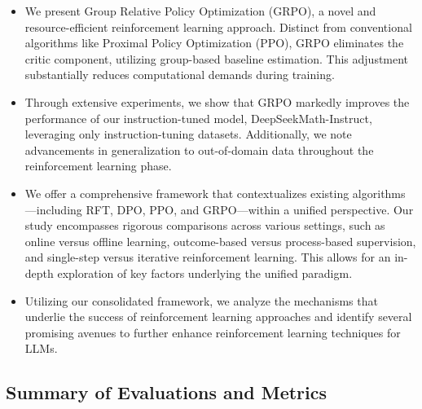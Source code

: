 \begin{itemize}[topsep=0pt]
    \item We present Group Relative Policy Optimization (GRPO), a novel and resource-efficient reinforcement learning approach. Distinct from conventional algorithms like Proximal Policy Optimization (PPO), GRPO eliminates the critic component, utilizing group-based baseline estimation. This adjustment substantially reduces computational demands during training.
    \item Through extensive experiments, we show that GRPO markedly improves the performance of our instruction-tuned model, DeepSeekMath-Instruct, leveraging only instruction-tuning datasets. Additionally, we note advancements in generalization to out-of-domain data throughout the reinforcement learning phase.
    \item We offer a comprehensive framework that contextualizes existing algorithms—including RFT, DPO, PPO, and GRPO—within a unified perspective. Our study encompasses rigorous comparisons across various settings, such as online versus offline learning, outcome-based versus process-based supervision, and single-step versus iterative reinforcement learning. This allows for an in-depth exploration of key factors underlying the unified paradigm.
    \item Utilizing our consolidated framework, we analyze the mechanisms that underlie the success of reinforcement learning approaches and identify several promising avenues to further enhance reinforcement learning techniques for LLMs.
\end{itemize}

\subsection{Summary of Evaluations and Metrics}

